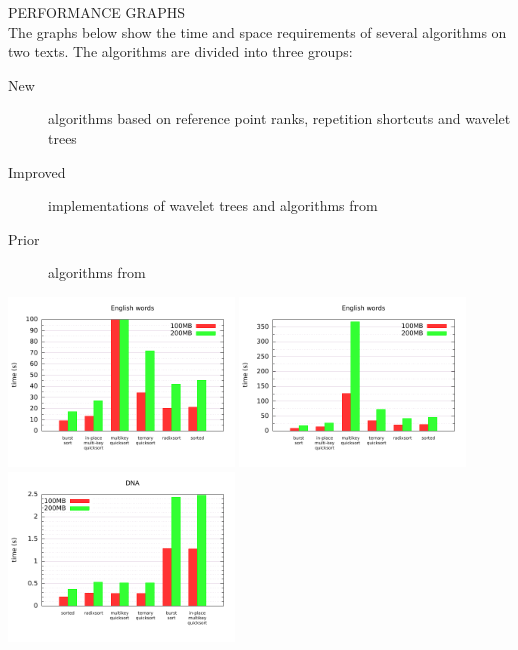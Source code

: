 {\sffamily\normalsize{\color{sciorange} PERFORMANCE GRAPHS}}\vspace{1mm}\\
\footnotesize 
The graphs below show the time and space requirements of several
algorithms on two texts.  The algorithms are divided
into three groups:
\begin{description}
\item[\color{new}New] algorithms based on reference point ranks, repetition
shortcuts and wavelet trees
\item[\color{improved}Improved] implementations of wavelet trees and
algorithms from
\item[\color{prior}Prior] algorithms from
\end{description}
\vspace{2mm}
\includegraphics[width=60mm]{words-0-100.pdf}
\includegraphics[width=60mm]{words-0-400.pdf}
\includegraphics[width=60mm]{dna.pdf}

